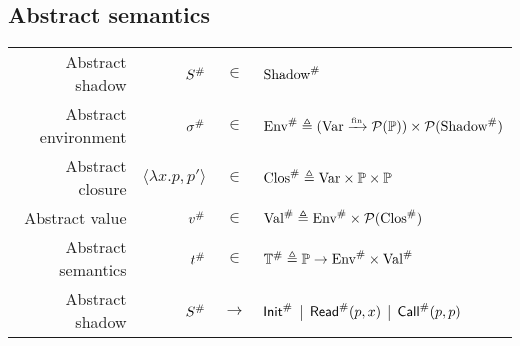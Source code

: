 \subsection{Abstract semantics}
\begin{center}
  \begin{tabular}{rrcl}
    Abstract shadow      & ${S}^{\#}$                 & $\in$         & ${\text{Shadow}}^{\#}$                                                                     \\
    Abstract environment & ${\sigma}^{\#}$                   & $\in$         & ${\text{Env}}^{\#}\triangleq({\text{Var}}\xrightarrow{\mbox{\tiny{fin}}}{\mathcal{P}(\mathbb{P})})\times\mathcal{P}({\text{Shadow}}^{\#})$ \\
    Abstract closure     & $\langle\lambda x.p,p'\rangle$ & $\in$         & ${\text{Clos}}^{\#}\triangleq\text{Var}\times\mathbb{P}\times\mathbb{P}$              \\
    Abstract value       & ${v}^{\#}$                      & $\in$         & ${\text{Val}}^{\#}\triangleq{\text{Env}}^{\#}\times\mathcal{P}({\text{Clos}}^{\#})$                   \\
    Abstract semantics   & ${t}^{\#}$                   & $\in$         & ${\mathbb{T}}^{\#}\triangleq\mathbb{P}\rightarrow{\text{Env}}^{\#}\times{\text{Val}}^{\#}$      \\
    Abstract shadow      & ${S}^{\#}$                 & $\rightarrow$ & ${\textsf{Init}}^{\#}$ | ${\textsf{Read}}^{\#}(p,x)$ | ${\textsf{Call}}^{\#}(p,p)$
  \end{tabular}
\end{center}
